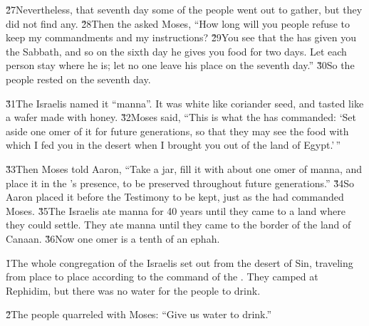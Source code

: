 \v{27}Nevertheless, that seventh day some of the people went out to gather, but they did not find any. \v{28}Then the  asked Moses, ``How long will you people refuse to keep my commandments and my instructions? \v{29}You see that the  has given you the Sabbath, and so on the sixth day he gives you food for two days. Let each person stay where he is; let no one leave his place on the seventh day.'' \v{30}So the people rested on the seventh day.

\v{31}The Israelis named it ``manna''. It was white like coriander seed, and tasted like a wafer made with honey. \v{32}Moses said, ``This is what the  has commanded: `Set aside one omer of it for future generations, so that they may see the food with which I fed you in the desert when I brought you out of the land of Egypt.'\,''

\v{33}Then Moses told Aaron, ``Take a jar, fill it with about one omer of manna, and place it in the 's presence, to be preserved throughout future generations.'' \v{34}So Aaron placed it before the Testimony to be kept, just as the  had commanded Moses. \v{35}The Israelis ate manna for 40 years until they came to a land where they could settle. They ate manna until they came to the border of the land of Canaan. \v{36}Now one omer is a tenth of an ephah.

\v{1}The whole congregation of the Israelis set out from the desert of Sin, traveling from place to place according to the command of the . They camped at Rephidim, but there was no water for the people to drink.

\v{2}The people quarreled with Moses: ``Give us water to drink.''


